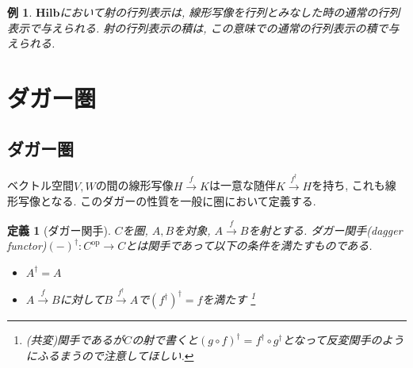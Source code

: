 \documentclass[a4paper,12pt]{ltjsarticle}
\theoremstyle{break}
\newtheorem{defn}[thm]{定義}
\newtheorem{thrm}[thm]{定理}
\newtheorem{eg}[thm]{例}
\newtheorem*{prf}{証明}
\newcommand{\hilb}{\mathbf{Hilb}}
\newcommand{\Hom}{\mathrm{Hom}}
\newcommand{\Op}{\mathrm{op}}
\newcommand{\xr}[1]{\xrightarrow{#1}}
\newcommand{\ci}{\circ}
\newcommand{\da}{\dagger}
\newcommand{\opl}{\oplus}
\numberwithin{equation}{section}
\begin{document}
\begin{eg}
  $\hilb$において射の行列表示は, 線形写像を行列とみなした時の通常の行列表示で与えられる. 
  射の行列表示の積は, この意味での通常の行列表示の積で与えられる. 
\end{eg}




\newpage

\section{ダガー圏}

\subsection{ダガー圏}

ベクトル空間$V,W$の間の線形写像$H \xr{f} K$は一意な随伴$K \xr{f^\da} H$を持ち, これも線形写像となる. 
このダガーの性質を一般に圏において定義する. 

\begin{defn}[ダガー関手]
  $C$を圏, $A,B$を対象, $A \xr{f} B$を射とする.  
  ダガー関手(dagger functor)$(-)^\da: C^{\Op} \to C$とは関手であって以下の条件を満たすものである. 
  \begin{itemize}
    \item $A^\da = A$
    \item $A \xr{f} B$に対して$B \xr{f^\da} A$で$(f^\da)^\da = f$を満たす
    \footnote{
      (共変)関手であるが$C$の射で書くと$(g \ci f)^\da = f^\da \ci g^\da$となって反変関手のようにふるまうので注意してほしい. 
    }
  \end{itemize}
\end{defn}
\end{document}
